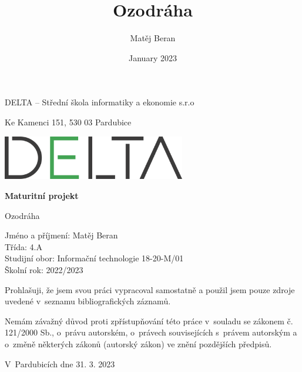 \documentclass[12pt]{book}
\title{Ozodráha}
\author{Matěj Beran }
\date{January 2023}
\begin{document}
\flushbottom
\begin{titlepage}
    \begin{center}
        \vspace*{1cm}
        \Large DELTA – Střední škola informatiky a ekonomie s.r.o
        
        Ke Kamenci 151, 530 03 Pardubice

        
        \includegraphics[width=0.6\textwidth]{images/logo_delta.png}
        
        
        {\Huge
        \textbf{Maturitní projekt}}
            
        \vspace{0.5cm}
        \text
        Ozodráha
            
        \vspace{1.5cm}
            
        \vfill
            
        Jméno a příjmení: Matěj Beran\\
        Třída: 4.A\\
        Studijní obor: Informační technologie 18-20-M/01\\
        Školní rok: 2022/2023
            
        \vspace{0.8cm}
            
            
            
    \end{center}
\end{titlepage}
   
   \newpage
   \thispagestyle{empty}

\noindent Prohlašuji, že jsem svou práci vypracoval samostatně a použil jsem pouze zdroje uvedené v~seznamu bibliografických záznamů.

\noindent Nemám závažný důvod proti zpřístupňování této práce v~souladu se zákonem č. 121/2000 Sb., o~právu autorském, o~právech souvisejících s~právem autorským a o~změně některých zákonů (autorský zákon) ve znění pozdějších předpisů. 

\vspace{24 pt}

\noindent V~Pardubicích dne 31. 3. 2023 \dotfill{} 
\end{document}
